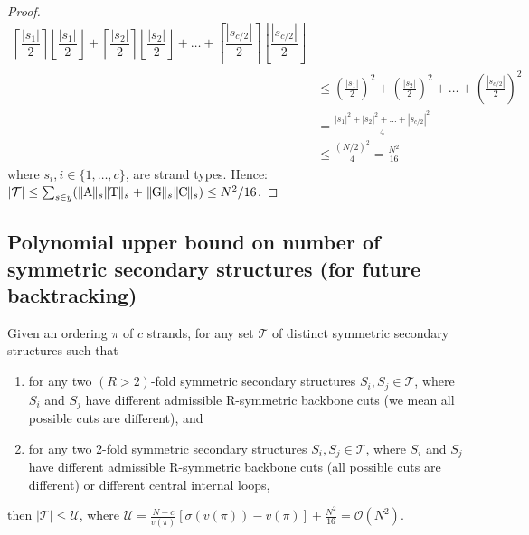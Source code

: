 \begin{proof}
\begin{align*}
		\left\lceil\dfrac{|s_1|}{2}\right\rceil
		\left\lfloor\dfrac{|s_1|}{2}\right\rfloor + 
		\left\lceil\dfrac{|s_2|}{2}\right\rceil
		\left\lfloor\dfrac{|s_2|}{2}\right\rfloor + \ldots + 
		\left\lceil\dfrac{|s_{c/2}|}{2}\right\rceil
		\left\lfloor\dfrac{|s_{c/2}|}{2}\right\rfloor \\
		& \leq 
		\left(\frac{|s_1|}{2}\right)^2 + \left(\frac{|s_2|}{2}\right)^2 + \ldots + \left(\frac{|s_{c/2}|}{2}\right)^2 \\
		&= 
		\frac{|s_1|^2 + |s_2|^2 + \ldots + |s_{c/2}|^2}{4} \\
		& \leq 
		\frac{(N/2)^2}{4} 
		=
		\frac{N^2}{16} 
	\end{align*}
	where $s_i, i \in \{1,\ldots,c\}$, are strand types. 
	Hence:  	 $ |\mathcal{T}| \leq \sum_{s\in y} (\parallel\! \! \baseA \!\! \parallel_s \parallel\! \! \baseT \!\! \parallel_s+ \parallel\! \! \baseG \!\! \parallel_s\parallel\! \! \baseC \!\! \parallel_s ) \leq N^2/16$. 
\end{proof}









\subsection{Polynomial upper bound on number of symmetric secondary structures (for future backtracking)}
\begin{lemma}\label{lem:polyub}
	
	Given an ordering $\pi$ of $c$ strands, 
	for any set $\mathcal{T}$ of distinct symmetric secondary structures such that 
	\begin{enumerate}
		\item  for any two $(R>2)$-fold symmetric secondary structures $S_i, S_j \in \mathcal{T}$, where $S_i$ and $S_j$ have different admissible R-symmetric backbone cuts (we mean all possible cuts are different), 	
		and 
		\item 
		for any two 2-fold symmetric secondary structures $S_i, S_j \in \mathcal{T}$, where $S_i$ and $S_j$ have different admissible R-symmetric backbone cuts (all possible cuts are different)
		or  different central internal loops, 
	\end{enumerate}
	then $|\mathcal{T}| \leq \mathcal{U}$, where $\mathcal{U} =  \frac{N-c}{v(\pi)} \left[ \sigma(v(\pi))-v(\pi) \right] + \frac{N^2}{16} = \mathcal{O}(N^2)$. 
\end{lemma}

